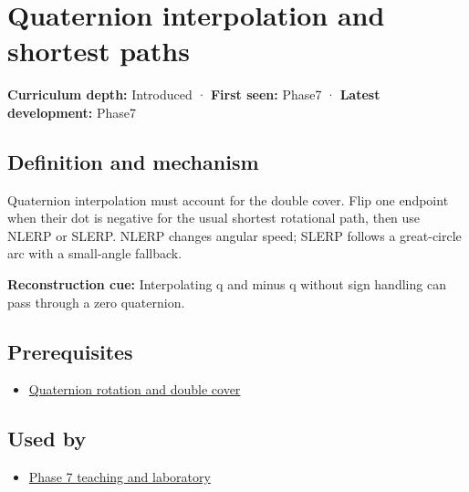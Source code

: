 \hypertarget{appendix-9b4b8254f26b}{}\label{referencestart:appendix-9b4b8254f26b}
\section{Quaternion interpolation and shortest paths}\label{appendix-9b4b8254f26b-quaternion-interpolation-and-shortest-paths}

\textbf{Curriculum depth:} Introduced · \textbf{First seen:} Phase7 · \textbf{Latest development:} Phase7

\begin{allmightroledefinition}

\subsection{Definition and mechanism}\label{appendix-9b4b8254f26b-definition-and-mechanism}

Quaternion interpolation must account for the double cover. Flip one endpoint when their dot is negative for the usual shortest rotational path, then use NLERP or SLERP. NLERP changes angular speed; SLERP follows a great-circle arc with a small-angle fallback.

\end{allmightroledefinition}

\textbf{Reconstruction cue:} Interpolating q and minus q without sign handling can pass through a zero quaternion.

\subsection{Prerequisites}\label{appendix-9b4b8254f26b-prerequisites}

\begin{itemize}
\tightlist
\item
  \hyperref[appendix-8e61ab68f6b2]{Quaternion rotation and double cover}
\end{itemize}

\subsection{Used by}\label{appendix-9b4b8254f26b-used-by}

\begin{itemize}
\tightlist
\item
  \hyperref[01-foundations-i-ch018-keep-the-promises-visible-while-moving-between-representations]{Phase 7 teaching and laboratory}
\end{itemize}

